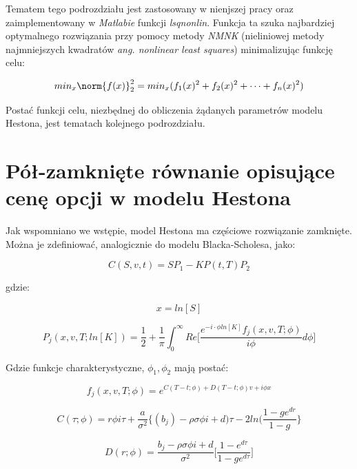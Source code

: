 \documentclass{pracamgr}
\begin{document}
Tematem tego podrozdziału jest zastosowany w nienjszej pracy oraz zaimplementowany w \textit{Matlabie} funkcji \textit{lsqnonlin}. Funkcja ta szuka najbardziej optymalnego rozwiązania przy pomocy metody \textit{NMNK} (nieliniowej metody najmniejszych kwadratów \textit{ang. nonlinear least squares}) minimalizując funkcję celu:

\begin{equation}
  min_x \norm{f(x)}^2_2 = min_x(f_1(x)^2 + f_2(x)^2 + \cdots + f_n(x)^2)
\end{equation}

Postać funkcji celu, niezbędnej do obliczenia żądanych parametrów modelu Hestona, jest tematach kolejnego podrozdziału.

\section{Pół-zamknięte równanie opisujące cenę opcji w modelu Hestona}

Jak wspomniano we wstępie, model Hestona ma częściowe rozwiązanie zamknięte. Można je zdefiniować, analogicznie do modelu Blacka-Scholesa, jako:

\begin{equation}
  C(S, v, t) = SP_1 -K P(t,T) P_2
\end{equation}

gdzie:

\begin{equation}
  x = ln[S]
\end{equation}

\begin{equation}
  P_j (x, v, T; ln[K]) = \frac{1}{2} + \frac{1}{\pi} \int_{0}^{\infty} Re \bigg[ \frac{e^{-i \cdot \phi ln[K]} f_j(x, v, T; \phi) }{i \phi} d \phi \bigg]
\end{equation}

Gdzie funkcje charakterystyczne, $\phi_1, \phi_2$ mają postać: 

\begin{equation}
   f_j(x, v, T; \phi) = e^{C(T-t; \phi) + D(T-t; \phi)v + i \phi x}
\end{equation}

\begin{equation}
  C (\tau; \phi) = r \phi i \tau + \frac{a}{\sigma^2} \bigg\{ (b_j) - \rho \sigma \phi i + d) \tau - 2 ln (\frac{1 - ge^{dr}}{1-g} \bigg\}
\end{equation}

\begin{equation}
D (r; \phi)  = \frac{b_j- \rho \sigma \phi i + d}{\sigma^2} \bigg[ \frac{1 - e^{d\tau}}{1 - ge^{d\tau}} \bigg]  
\end{equation}
\end{document}
